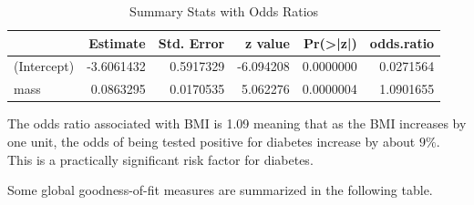 \documentclass[
]{book}
\newenvironment{Shaded}{\begin{snugshade}}{\end{snugshade}}
\newcommand{\AttributeTok}[1]{\textcolor[rgb]{0.13,0.29,0.53}{#1}}
\newcommand{\CommentTok}[1]{\textcolor[rgb]{0.56,0.35,0.01}{\textit{#1}}}
\newcommand{\DocumentationTok}[1]{\textcolor[rgb]{0.56,0.35,0.01}{\textbf{\textit{#1}}}}
\newcommand{\FloatTok}[1]{\textcolor[rgb]{0.00,0.00,0.81}{#1}}
\newcommand{\FunctionTok}[1]{\textcolor[rgb]{0.13,0.29,0.53}{\textbf{#1}}}
\newcommand{\NormalTok}[1]{#1}
\newcommand{\OtherTok}[1]{\textcolor[rgb]{0.56,0.35,0.01}{#1}}
\newcommand{\SpecialCharTok}[1]{\textcolor[rgb]{0.81,0.36,0.00}{\textbf{#1}}}
\newcommand{\StringTok}[1]{\textcolor[rgb]{0.31,0.60,0.02}{#1}}
\begin{document}
\begin{Shaded}
\end{Shaded}

\begin{table}

\caption{\label{tab:unnamed-chunk-126}Summary Stats with Odds Ratios}
\centering
\begin{tabular}[t]{l|r|r|r|r|r}
\hline
  & Estimate & Std. Error & z value & Pr(>|z|) & odds.ratio\\
\hline
(Intercept) & -3.6061432 & 0.5917329 & -6.094208 & 0.0000000 & 0.0271564\\
\hline
mass & 0.0863295 & 0.0170535 & 5.062276 & 0.0000004 & 1.0901655\\
\hline
\end{tabular}
\end{table}

The odds ratio associated with BMI is 1.09 meaning that as the BMI increases by one unit, the odds of being tested positive for diabetes increase by about \(9\%\). This is a practically significant risk factor for diabetes.

Some global goodness-of-fit measures are summarized in the following table.

\begin{Shaded}
\end{Shaded}
\end{document}
